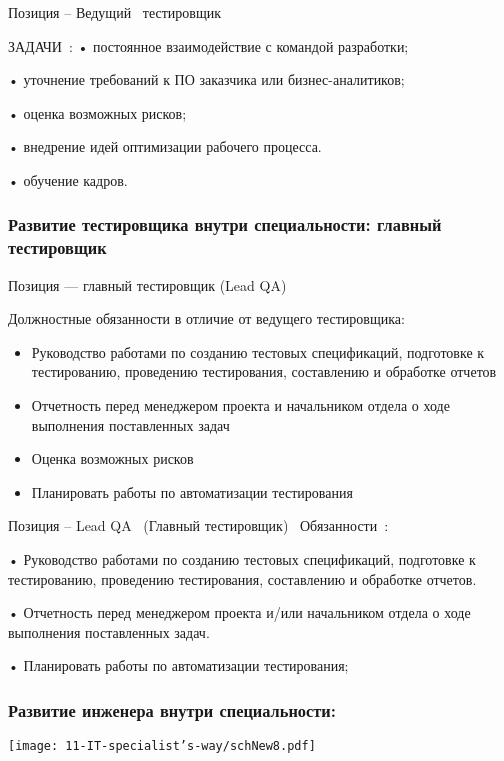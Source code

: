 \documentclass{../industrial-development}
\begin{document}
\lecturenotes

Позиция – Ведущий~\cite{hh} тестировщик~\cite{itcf}

ЗАДАЧИ~\cite{rab}:
•	постоянное взаимодействие с командой разработки;

•	уточнение требований к ПО заказчика или бизнес-аналитиков;

•	оценка возможных рисков;

•	внедрение идей оптимизации рабочего процесса.

•	обучение кадров.


\begin{frame} \frametitle{Развитие тестировщика внутри специальности: главный тестировщик}
 \begin{block}{}
  \alert{Позиция --- главный тестировщик (Lead QA)}

Должностные обязанности в отличие от ведущего тестировщика: 
  \end{block}
  \begin{itemize}
  \item Руководство работами по созданию тестовых спецификаций, подготовке к тестированию, проведению тестирования, составлению и обработке отчетов
  \item Отчетность перед менеджером проекта и начальником отдела о ходе выполнения поставленных задач
  \item Оценка возможных рисков
 \item Планировать работы по автоматизации тестирования
  \end{itemize}
\end{frame}

\lecturenotes

Позиция – Lead QA~\cite{hh} (Главный тестировщик)~\cite{itcf}
Обязанности~\cite{rab}:

•	Руководство работами по созданию тестовых спецификаций, подготовке к тестированию, проведению тестирования, составлению и обработке отчетов.

•	Отчетность перед менеджером проекта и/или начальником отдела о ходе выполнения поставленных задач.

•	Планировать работы по автоматизации тестирования;




\begin{frame} \frametitle{Развитие инженера внутри специальности: }
  \centerline{\texttt{[image: 11-IT-specialist's-way/schNew8.pdf]}}
\end{frame}
\end{document}
